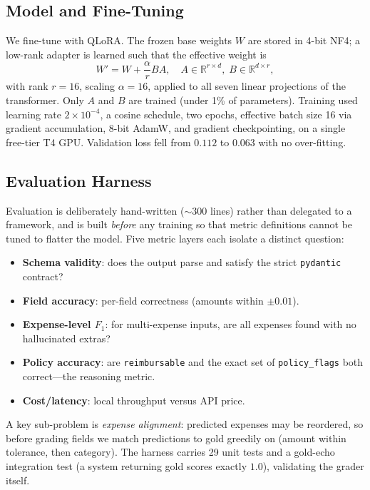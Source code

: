 \documentclass[conference]{IEEEtran}
\begin{document}
\subsection{Model and Fine-Tuning}
We fine-tune with QLoRA. The frozen base weights $W$ are stored in 4-bit NF4;
a low-rank adapter is learned such that the effective weight is
\begin{equation}
W' = W + \frac{\alpha}{r} B A, \quad A \in \mathbb{R}^{r \times d},\;
B \in \mathbb{R}^{d \times r},
\end{equation}
with rank $r=16$, scaling $\alpha=16$, applied to all seven linear projections
of the transformer. Only $A$ and $B$ are trained (under 1\% of parameters).
Training used learning rate $2\times10^{-4}$, a cosine schedule, two epochs,
effective batch size 16 via gradient accumulation, 8-bit AdamW, and gradient
checkpointing, on a single free-tier T4 GPU. Validation loss fell from
$0.112$ to $0.063$ with no over-fitting.

\subsection{Evaluation Harness}
Evaluation is deliberately hand-written ($\sim$300 lines) rather than delegated
to a framework, and is built \emph{before} any training so that metric
definitions cannot be tuned to flatter the model. Five metric layers each
isolate a distinct question:
\begin{itemize}
  \item \textbf{Schema validity}: does the output parse and satisfy the strict
        \texttt{pydantic} contract?
  \item \textbf{Field accuracy}: per-field correctness (amounts within
        $\pm 0.01$).
  \item \textbf{Expense-level $F_1$}: for multi-expense inputs, are all
        expenses found with no hallucinated extras?
  \item \textbf{Policy accuracy}: are \texttt{reimbursable} and the exact set
        of \texttt{policy\_flags} both correct---the reasoning metric.
  \item \textbf{Cost/latency}: local throughput versus API price.
\end{itemize}
A key sub-problem is \emph{expense alignment}: predicted expenses may be
reordered, so before grading fields we match predictions to gold greedily on
(amount within tolerance, then category). The harness carries 29 unit tests and
a gold-echo integration test (a system returning gold scores exactly $1.0$),
validating the grader itself.
\end{document}
